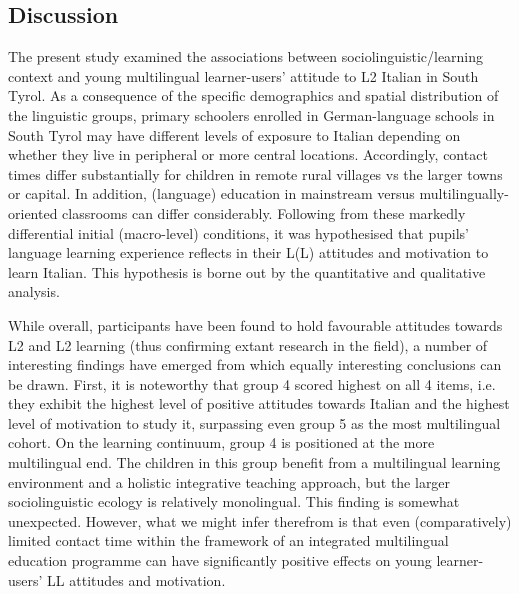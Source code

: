 \documentclass[output=paper]{../langscibook}
\begin{document}
\subsection{Discussion}


The present study examined the associations between sociolinguistic/learning context and young multilingual learner-users’ attitude to L2 Italian in South Tyrol. As a consequence of the specific demographics and spatial distribution of the linguistic groups, primary schoolers enrolled in German-language schools in South Tyrol may have different levels of exposure to Italian depending on whether they live in peripheral or more central locations. Accordingly, contact times differ substantially for children in remote rural villages vs the larger towns or capital. In addition, (language) education in mainstream versus multilingually-oriented classrooms can differ considerably. Following from these markedly differential initial (macro-level) conditions, it was hypothesised that pupils’ language learning experience reflects in their L(L) attitudes and motivation to learn Italian. This hypothesis is borne out by the quantitative and qualitative analysis. 

While overall, participants have been found to hold favourable attitudes towards L2 and L2 learning (thus confirming extant research in the field), a number of interesting findings have emerged from which equally interesting conclusions can be drawn. First, it is noteworthy that group 4 scored highest on all 4 items, i.e. they exhibit the highest level of positive attitudes towards Italian and the highest level of motivation to study it, surpassing even group 5 as the most multilingual cohort. On the learning continuum, group 4 is positioned at the more multilingual end. The children in this group benefit from a multilingual learning environment and a holistic integrative teaching approach, but the larger sociolinguistic ecology is relatively monolingual. This finding is somewhat unexpected. However, what we might infer therefrom is that even (comparatively) limited contact time within the framework of an integrated multilingual education programme can have significantly positive effects on young learner-users’ LL attitudes and motivation. 
\end{document}
